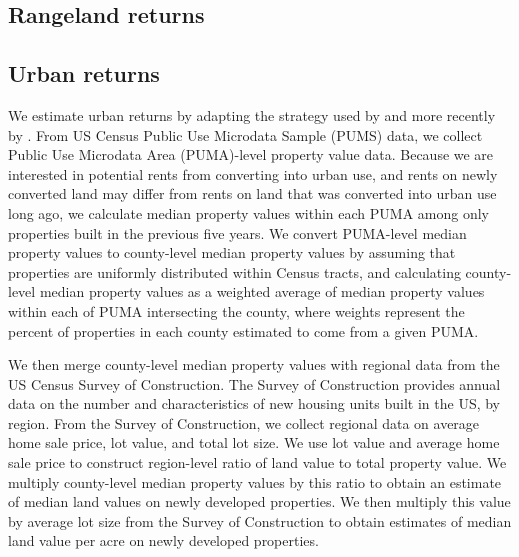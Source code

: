 \documentclass[11pt]{article}
\begin{document}
\subsection{Rangeland returns}


\subsection{Urban returns}

We estimate urban returns by adapting the strategy used by \citet{lubowski2006} and more recently by \citet{mihiarlewis}. From US Census Public Use Microdata Sample (PUMS) data, we collect Public Use Microdata Area (PUMA)-level property value data. Because we are interested in potential rents from converting into urban use, and rents on newly converted land may differ from rents on land that was converted into urban use long ago, we calculate median property values within each PUMA among only properties built in the previous five years. We convert PUMA-level median property values to county-level median property values by assuming that properties are uniformly distributed within Census tracts, and calculating county-level median property values as a weighted average of median property values within each of PUMA intersecting the county, where weights represent the percent of properties in each county estimated to come from a given PUMA. 

We then merge county-level median property values with regional data from the US Census Survey of Construction. The Survey of Construction provides annual data on the number and characteristics of new housing units built in the US, by region. From the Survey of Construction, we collect regional data on average home sale price, lot value, and total lot size. We use lot value and average home sale price to construct region-level ratio of land value to total property value. We multiply county-level median property values by this ratio to obtain an estimate of median land values on newly developed properties. We then multiply this value by average lot size from the Survey of Construction to obtain estimates of median land value per acre on newly developed properties.
\end{document}
